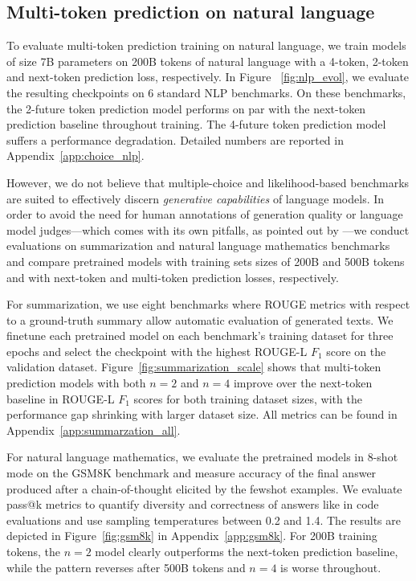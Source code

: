 \vspace{-1em}
\subsection{Multi-token prediction on natural language}
\label{sect:nlp}

To evaluate multi-token prediction training on natural language, we train models of size 7B parameters on 200B tokens of natural language with a 4-token, 2-token and next-token prediction loss, respectively. In Figure ~\ref{fig:nlp_evol}, we evaluate the resulting checkpoints on 6 standard NLP benchmarks. On these benchmarks, the 2-future token prediction model performs on par with the next-token prediction baseline throughout training. The 4-future token prediction model suffers a performance degradation. Detailed numbers are reported in Appendix~\ref{app:choice_nlp}.



However, we do not believe that multiple-choice and likelihood-based benchmarks are suited to effectively discern \emph{generative capabilities} of language models. In order to avoid the need for human annotations of generation quality or language model judges---which comes with its own pitfalls, as pointed out by \citet{koo2023benchmarking}---we conduct evaluations on summarization and natural language mathematics benchmarks and compare pretrained models with training sets sizes of 200B and 500B tokens and with next-token and multi-token prediction losses, respectively.

For summarization, we use eight benchmarks where ROUGE metrics \citep{lin-2004-rouge} with respect to a ground-truth summary allow automatic evaluation of generated texts. We finetune each pretrained model on each benchmark's training dataset for three epochs and select the checkpoint with the highest ROUGE-L $F_1$ score on the validation dataset.
Figure~\ref{fig:summarization_scale} shows that multi-token prediction models  with both $n=2$ and $n=4$ improve over the next-token baseline in ROUGE-L $F_1$ scores for both training dataset sizes,
with the performance gap shrinking with larger dataset size. All metrics can be found in Appendix~\ref{app:summarzation_all}.


For natural language mathematics, we evaluate the pretrained models in 8-shot mode on the GSM8K benchmark \citep{cobbe2021training} and measure accuracy of the final answer produced after a chain-of-thought elicited by the fewshot examples. We evaluate pass@k metrics to quantify diversity and correctness of answers like in code evaluations and use sampling temperatures between 0.2 and 1.4. The results are depicted in Figure~\ref{fig:gsm8k} in Appendix~\ref{app:gsm8k}. For 200B training tokens, the $n=2$ model clearly outperforms the next-token prediction baseline, while the pattern reverses after 500B tokens and $n=4$ is worse throughout.






